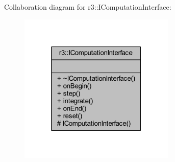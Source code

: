 Collaboration diagram for r3\+:\+:I\+Computation\+Interface\+:\nopagebreak
\begin{figure}[H]
\begin{center}
\leavevmode
\includegraphics[width=211pt]{classr3_1_1_i_computation_interface__coll__graph}
\end{center}
\end{figure}
